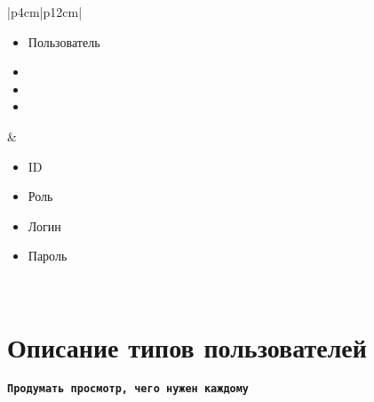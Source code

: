\begin{table}[h!]
\begin{center}
\begin{threeparttable}
\begin{tabular}{|p{4cm}|p{12cm}|}
            \hline
            \begin{minipage}[t]{\linewidth}
              \begin{multicols}{0}
                \begin{itemize}[labelsep=0mm,nosep,after=\strut]
                  \item[] Пользователь
                  \item[]
                  \item[]
                  \item[]
                \end{itemize}
              \end{multicols}
            \end{minipage}
          & \begin{minipage}[t]{\linewidth}
              \begin{multicols}{2}
                \begin{itemize}[labelsep=0mm,nosep,after=\strut]
                  \item[] ID
                  \item[] Роль
                  \item[] Логин
                  \item[] Пароль
                \end{itemize}
              \end{multicols}
            \end{minipage}\\
           \hline
        \end{tabular}
    \end{threeparttable}
    \end{center}
\end{table} 

\section{Описание типов пользователей}

\textbf{\texttt{Продумать просмотр, чего нужен каждому}}

